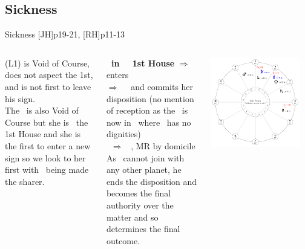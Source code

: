 \subsection{Sickness}
\begin{frame}[t]{Sickness [JH]p19-21, [RH]p11-13 }

\begin{columns}[T, onlytextwidth]
\Mercury (L1) is Void of Course, does not aspect the 1st, and is not first to leave his sign. \\
\vspace{0.2cm}
The \Moon\ is also Void of Course but she is \Trine\ the 1st House and she is the first to enter a new sign so we look to her first with \Mercury\ being made the sharer. \\
\vspace{0.2cm}

\textbf{\Moon\ in \Taurus\ \Trine\ 1st House} $\Rightarrow$ enters \Gemini \\
$\Rightarrow$ \Square\ \Venus\ and commits her disposition (no mention of reception as the \Moon\ is now in \Gemini\ where \Venus\ has no dignities) \\
\Venus\ $\Rightarrow$ \Sextile\ \Jupiter, MR by domicile \\
\vspace{0.2cm}
As \Jupiter\ cannot join with any other planet\footnotemark[1], he ends the disposition and becomes the final authority over the matter and so determines the final outcome.
\vspace{0.2cm}

\begin{center}
{\includegraphics[width=0.9\textwidth]{charts/21-chart-sickness}} \\
\vspace{-0.2cm}
\end{center}
\end{columns}
\end{frame}
